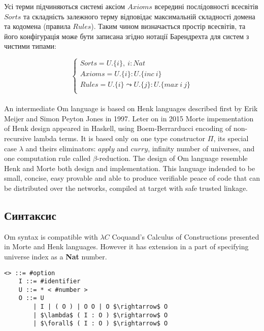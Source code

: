 Усі терми підчиняються системі аксіом $Axioms$ всередині послідовності всесвітів $Sorts$
та складність залежного терму відповідає максимальній складності домена та кодомена (правила $Rules$).
Таким чином визначається простір всесвітів, та його конфігурація може бути записана
згідно нотації Барендрехта для систем з чистими типами:

$$
\begin{cases}
    Sorts = U.\{i\},\ i : Nat\\
    Axioms = U.\{i\} : U.\{inc\ i\}\\
    Rules = U.\{i\} \leadsto U.\{j\} : U.\{max\ i\ j\}\\
\end{cases}
$$

\paragraph{}
An intermediate Om language is based on Henk\cite{henk} languages described first
by Erik Meijer and Simon Peyton Jones in 1997. Leter on in 2015 Morte impementation
of Henk design appeared in Haskell, using Boem-Berrarducci encoding of non-recursive lambda terms.
It is based only on one type constructor $\Pi$, its special case $\lambda$ and theirs eliminators:
$apply$ and $curry$, infinity number of universes,
and one computation rule called $\beta$-reduction.
The design of Om language resemble Henk and Morte both
design and implementation. This language indended to be small, concise, easy provable
and able to produce verifiable peace of code that can be distributed over the networks,
compiled at target with safe trusted linkage.

\newpage
\subsection{Синтаксис}
\vspace{0.5cm}
Om syntax is compatible with $\lambda C$ Coquand's Calculus of Constructions presented
in Morte and Henk languages. However it has extension in a part of specifying
universe index as a {\bf Nat} number.

\vspace{0.5cm}
\begin{lstlisting}[mathescape=true]
   <> ::= #option
    I ::= #identifier
    U ::= * < #number >
    O ::= U
        | I | ( O ) | O O | O $\rightarrow$ O
        | $\lambda$ ( I : O ) $\rightarrow$ O
        | $\forall$ ( I : O ) $\rightarrow$ O
\end{lstlisting}

